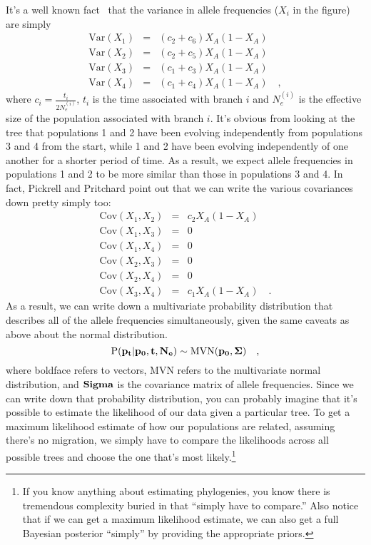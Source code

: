 \documentclass[12pt]{article}
\begin{document}
It's a well known fact~\cite{CavalliSforza-Edwards-1967} that the
variance in allele frequencies ($X_i$ in the figure) are simply
\begin{eqnarray*}
  \mbox{Var}(X_1) &=& (c_2 + c_6)X_A(1-X_A) \\
  \mbox{Var}(X_2) &=& (c_2 + c_5)X_A(1-X_A) \\
  \mbox{Var}(X_3) &=& (c_1 + c_3)X_A(1-X_A) \\
  \mbox{Var}(X_4) &=& (c_1 + c_4)X_A(1-X_A) \quad ,
\end{eqnarray*}
where $c_i = \frac{t_i}{2N_e^{(i)}}$, $t_i$ is the time associated
with branch $i$ and $N_e^{(i)}$ is the effective size of the
population associated with branch $i$. It's obvious from looking at
the tree that populations 1 and 2 have been evolving independently
from populations 3 and 4 from the start, while 1 and 2 have been
evolving independently of one another for a shorter period of time. As
a result, we expect allele frequencies in populations 1 and 2 to be
more similar than those in populations 3 and 4. In fact, Pickrell and
Pritchard point out that we can write the various covariances down
pretty simply too:
\begin{eqnarray*}
  \mbox{Cov}(X_1,X_2) &=& c_2X_A(1-X_A) \\
  \mbox{Cov}(X_1,X_3) &=& 0 \\
  \mbox{Cov}(X_1,X_4) &=& 0 \\
  \mbox{Cov}(X_2,X_3) &=& 0 \\
  \mbox{Cov}(X_2,X_4) &=& 0 \\
  \mbox{Cov}(X_3,X_4) &=& c_1X_A(1-X_A) \quad .
\end{eqnarray*}
As a result, we can write down a multivariate probability distribution
that describes all of the allele frequencies simultaneously, given the
same caveats as above about the normal distribution.
\[
  \mbox{P}(\bf p_t|\bf p_0, \bf t, \bf N_e) \sim \mbox{MVN}(\bf p_0,
  \bf \Sigma) \quad ,
\]
where boldface refers to vectors, MVN refers to the multivariate
normal distribution, and $\bf Sigma$ is the covariance matrix of
allele frequencies. Since we can write down that probability
distribution, you can probably imagine that it's possible to estimate
the likelihood of our data given a particular tree. To get a maximum
likelihood estimate of how our populations are related, assuming
there's no migration, we simply have to compare the likelihoods across
all possible trees and choose the one that's most likely.\footnote{If
  you know anything about estimating phylogenies, you know there is
  tremendous complexity buried in that ``simply have to compare.''
  Also notice that if we can get a maximum likelihood estimate, we can
  also get a full Bayesian posterior ``simply'' by providing the
  appropriate priors.}
\end{document}
